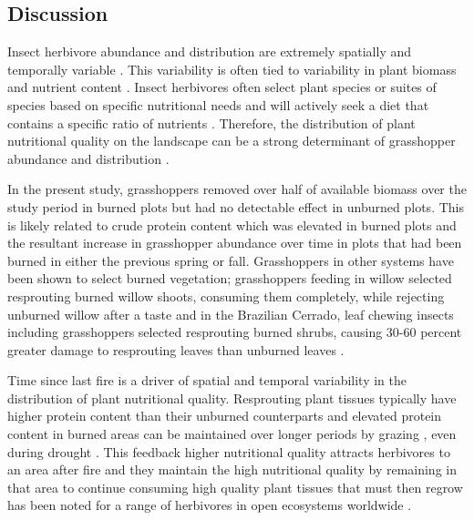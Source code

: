 \documentclass[referee, 
	            sn-basic]
           {sn-jnl}
\begin{document}
\begin{linenumbers}
\section{Discussion}

Insect herbivore abundance and distribution are extremely spatially and temporally variable \citep{cappuccino1995}. This variability is often tied to variability in plant biomass and nutrient content \citep{joern2012}. Insect herbivores often select plant species or suites of species based on specific nutritional needs \citep{ibanez2013, behmer2008} and will actively seek a diet that contains a specific ratio of nutrients \citep{behmer2009}. Therefore, the distribution of plant nutritional quality on the landscape can be a strong determinant of grasshopper abundance and distribution \citep{white2012}. 

In the present study, grasshoppers removed over half of available biomass over the study period in burned plots but had no detectable effect in unburned plots. This is likely related to crude protein content which was elevated in burned plots and the resultant increase in grasshopper abundance over time in plots that had been burned in either the previous spring or fall. Grasshoppers in other systems have been shown to select burned vegetation; grasshoppers feeding in willow selected resprouting burned willow shoots, consuming them completely, while rejecting unburned willow after a taste \citep{stein1992} and in the Brazilian Cerrado, leaf chewing insects including grasshoppers selected resprouting burned shrubs, causing 30-60 percent greater damage to resprouting leaves than unburned leaves \citep{lopes2011}. 

Time since last fire is a driver of spatial and temporal variability in the distribution of plant nutritional quality. Resprouting plant tissues typically have higher protein content than their unburned counterparts \citep{mcgranahan2021} and elevated protein content in burned areas can be maintained over longer periods by grazing \citep{wanchuk2021}, even during drought \citep{spiess2020}. This feedback \textemdash higher nutritional quality attracts herbivores to an area after fire and they maintain the high nutritional quality by remaining in that area to continue consuming high quality plant tissues that must then regrow \textemdash has been noted for a range of herbivores in open ecosystems worldwide \citep{allred2011, archibald2005, sensenig2010}. 


\end{linenumbers}
\end{document}
